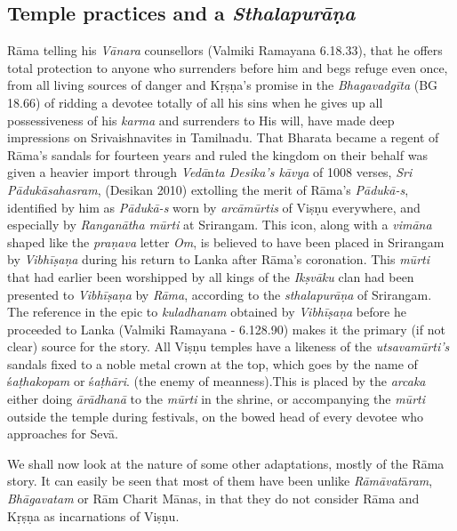 \subsection{Temple practices and a \textit{Sthalapurāṇa}}

\item Rāma telling his \textit{Vānara} counsellors (Valmiki Ramayana 6.18.33), that he offers total protection to anyone who surrenders before him and begs refuge even once, from all living sources of danger and Kṛṣṇa’s promise in the \textit{Bhagavadgīta} (BG 18.66) of ridding a devotee totally of all his sins when he gives up all possessiveness of his \textit{karma} and surrenders to His will, have made deep impressions on Srivaishnavites in Tamilnadu. That Bharata became a regent of Rāma’s sandals for fourteen years and ruled the kingdom on their behalf was given a heavier import through \textit{Vedā}n\textit{ta Desika’s kāvya} of 1008 verses, \textit{Sri Pādukāsahasram}, (Desikan 2010) extolling the merit of Rāma’s \textit{Pādukā-s}, identified by him as \textit{Pādukā-s} worn by \textit{arcāmūrtis} of Viṣṇu everywhere, and especially by \textit{Ranganātha mūrti} at Srirangam. This icon, along with a \textit{vimāna} shaped like the \textit{praṇava} letter \textit{Om}, is believed to have been placed in Srirangam by \textit{Vibhīṣaṇa} during his return to Lanka after Rāma’s coronation. This \textit{mūrti} that had earlier been worshipped by all kings of the \textit{Ikṣvāku} clan had been presented to \textit{Vibhīṣaṇa} by \textit{Rāma}, according to the \textit{sthalapurāṇa} of Srirangam. The reference in the epic to \textit{kuladhanam} obtained by \textit{Vibhīṣaṇa} before he proceeded to Lanka (Valmiki Ramayana - 6.128.90) makes it the primary (if not clear) source for the story. All Viṣṇu temples have a likeness of the \textit{utsavamūrti’s} sandals fixed to a noble metal crown at the top, which goes by the name of ś\textit{aṭhakopam} or ś\textit{aṭhāri}. (the enemy of meanness).This is placed by the \textit{arcaka} either doing \textit{ārādhanā} to the \textit{mūrti} in the shrine, or accompanying the \textit{mūrti} outside the temple during festivals, on the bowed head of every devotee who approaches for Sevā.

We shall now look at the nature of some other adaptations, mostly of the Rāma story. It can easily be seen that most of them have been unlike \textit{Rāmāvat}ā\textit{ram}, \textit{Bhāgavatam} or Rām Charit Mānas, in that they do not consider Rāma and Kṛṣṇa as incarnations of Viṣṇu.


